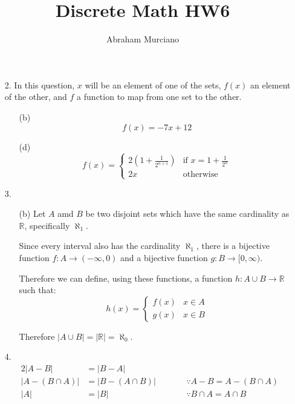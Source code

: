 \documentclass[fleqn]{article}
\title{Discrete Math HW6}
\author{Abraham Murciano}
\begin{document}
\maketitle

\begin{enumerate}

	\item[2.]
	In this question, \(x\) will be an element of one of the sets, \(f(x)\) an element of the other, and \(f\) a function to map from one set to the other.
	\begin{enumerate}
		\item[(b)]
		\[f(x) = -7x + 12\]

		\item[(d)]
		\[f(x) = 
		\begin{cases}
			2\left(1 + \frac{1}{2^{n + 1}}\right) & \text{if } x = 1 + \frac{1}{2^n} \\
			2x & \text{otherwise}
		\end{cases}\]
	\end{enumerate}

	\item[3.]
	\begin{enumerate}
		\item[(b)]
		Let \(A\) amd \(B\) be two disjoint sets which have the same cardinality as \(\mathbb{R}\), specifically \(\aleph_1\).
		
		Since every interval also has the cardinality \(\aleph_1\), there is a bijective function \(f : A \to (-\infty, 0)\) and a bijective function \(g : B \to [0, \infty)\).

		Therefore we can define, using these functions, a function \(h : A \cup B \to \mathbb{R}\) such that:
		\[h(x) = 
		\begin{cases}
			f(x) & x \in A \\
			g(x) & x \in B
		\end{cases}\]

		Therefore \(|A \cup B| = |\mathbb{R}| = \aleph_0\).
	\end{enumerate}

	\item[4.]
	\begin{alignat*}{2}
		|A - B| &= |B - A| \\
		|A - (B \cap A)| &= |B - (A \cap B)| & &\quad\quad \because A - B = A - (B \cap A)\\
		|A| &= |B| & &\quad\quad \because B \cap A = A \cap B
	\end{alignat*}


\end{enumerate}
\end{document}
